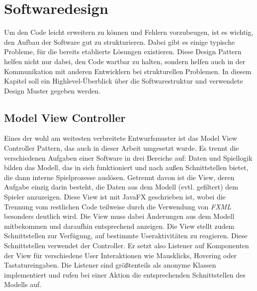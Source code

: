 \section{Softwaredesign} %
\label{sec:softwaredesign}

Um den Code leicht erweitern zu können und Fehlern vorzubeugen, ist es wichtig, den Aufbau der Software gut zu strukturieren. Dabei gibt es einige typische Probleme, für die bereits etablierte Lösungen existieren. Diese Design Pattern helfen nicht nur dabei, den Code wartbar zu halten, sondern helfen auch in der Kommunikation mit anderen Entwicklern bei strukturellen Problemen. In diesem Kapitel soll ein Highlevel-Überblick über die Softwarestruktur und verwendete Design Muster gegeben werden.

\subsection{Model View Controller} %
\label{sub:model_view_controller}
Eines der wohl am weitesten verbreitete Entwurfsmuster ist das Model View Controller Pattern, das auch in dieser Arbeit umgesetzt wurde. Es trennt die verschiedenen Aufgaben einer Software in drei Bereiche auf: Daten und Spiellogik bilden das Modell, das in sich funktioniert und nach außen Schnittstellen bietet, die dann interne Spielprozesse auslösen. Getrennt davon ist die View, deren Aufgabe einzig darin besteht, die Daten aus dem Modell (evtl. gefiltert) dem Spieler anzuzeigen. Diese View ist mit JavaFX geschrieben ist, wobei die Trennung vom restlichen Code teilweise durch die Verwendung von \emph{FXML} besonders deutlich wird. Die View muss dabei Änderungen aus dem Modell mitbekommen und daraufhin entsprechend anzeigen. Die View stellt zudem Schnittstellen zur Verfügung, auf bestimmte Useraktivitäten zu reagieren. Diese Schnittstellen verwendet der Controller. Er setzt also Listener auf Komponenten der View für verschiedene User Interaktionen wie Mausklicks, Hovering oder Tastatureingaben. Die Listener sind größtenteils als anonyme Klassen implementiert und rufen bei einer Aktion die entsprechenden Schnittstellen des Modells auf.  

